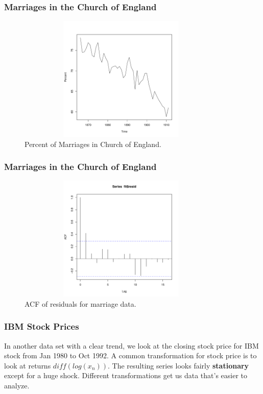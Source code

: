 \documentclass[%
xcolor=pdftex]{beamer}
\begin{document}
\begin{frame}
\frametitle{Marriages in the Church of England}

\begin{figure} \caption{Percent of Marriages in Church of England.}
\begin{center}
\includegraphics[width=100mm, height=60mm]{pics/marriage.pdf}
\end{center}
\end{figure}

\end{frame}

\begin{frame}
\frametitle{Marriages in the Church of England}

\begin{figure} \caption{ACF of residuals for marriage data.}
\begin{center}
\includegraphics[width=100mm, height=60mm]{pics/marriageacf.pdf}
\end{center}
\end{figure}

\end{frame}

\begin{frame}
\frametitle{IBM Stock Prices}

In another data set with a clear trend, we look at the closing stock price for IBM stock from Jan 1980 to Oct 1992.  A common transformation for stock price is to look at returns $diff(log(x_n))$. The resulting series looks fairly \textbf{stationary} except for a huge shock. Different transformations get us data that's easier to analyze.

\end{frame}
\end{document}
